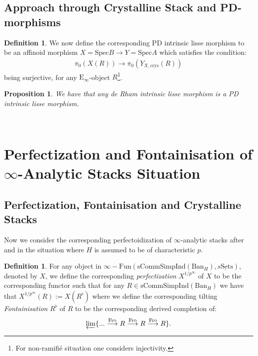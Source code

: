 \documentclass[12pt]{amsart}
\newtheorem{proposition}[theorem]{Proposition}
\theoremstyle{definition}
\newtheorem{definition}[theorem]{Definition}
\numberwithin{equation}{section}
\begin{document}
\subsection{Approach through Crystalline Stack and PD-morphisms}




\begin{definition}
We now define the corresponding PD intrinsic lisse morphism to be an affinoid morphism $X=\mathrm{Spec}B\rightarrow Y=\mathrm{Spec}A$ which satisfies the condition:
\begin{align}
\pi_0(X(R))\overset{}{\rightarrow}	\pi_0(Y_{X,\mathrm{crys}}(R))
\end{align}
being surjective, for any $\mathrm{E}_\infty$-object $R$\footnote{For non-ramifi\'e situation one considers injectivity.}.		
\end{definition}



\begin{proposition}
We have that any de Rham intrinsic lisse morphism is a PD intrinsic lisse morphism.	
\end{proposition}


\

\section{Perfectization and Fontainisation of $\infty$-Analytic Stacks Situation}

\subsection{Perfectization, Fontainisation and Crystalline Stacks}

\noindent Now we consider the corresponding perfectoidization of $\infty$-analytic stacks after \cite{R} and \cite{Dr1} in the situation where $H$ is assumed to be of characteristic $p$. 

\begin{definition}
For any object in $\infty-\mathrm{Fun}(\mathrm{sComm}\mathrm{Simp}\mathrm{Ind}(\mathrm{Ban}_H),\underline{s\mathrm{Sets}})$, denoted by $X$, we define the corresponding \textit{perfectization} $X^{1/p^\infty}$ of $X$ to be the corresponding functor such that for any $R\in \mathrm{sComm}\mathrm{Simp}\mathrm{Ind}(\mathrm{Ban}_H)$ we have that $X^{1/p^\infty}(R):=X(R^\flat)$ where we define the corresponding tilting \textit{Fontainisation} $R^\flat$ of $R$ to be the corresponding derived completion of:
\begin{align}
\varprojlim\{ ...\overset{\mathrm{Fro}}{\longrightarrow}	R \overset{\mathrm{Fro}}{\longrightarrow} R \overset{\mathrm{Fro}}{\longrightarrow} R\}.
\end{align}

\end{definition}
\end{document}
